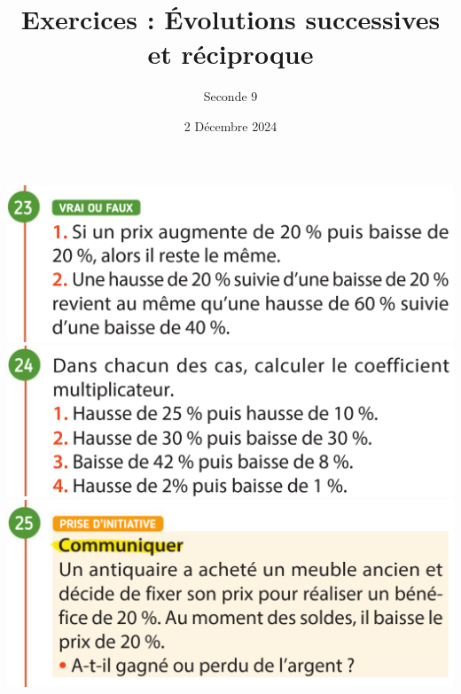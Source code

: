 \documentclass{article}
\title{Exercices : Évolutions successives et réciproque}
\date{2 Décembre 2024}
\author{Seconde 9}
\begin{document}
\maketitle
\begin{center}
\includegraphics[width=\textwidth]{Exercice_1.png}
\includegraphics[width=\textwidth]{Exercice_2.png}
\includegraphics[width=\textwidth]{Exercice_3.png}
\end{center}
\end{document}
